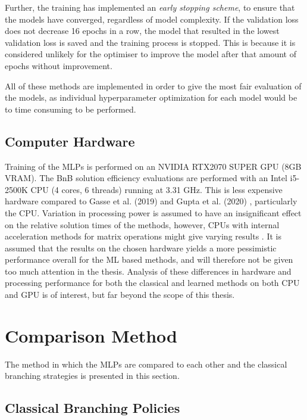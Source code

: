  Further, the training has implemented an \textit{early stopping scheme}, to ensure that the models have converged, regardless of model complexity. If the validation loss does not decrease 16 epochs in a row, the model that resulted in the lowest validation loss is saved and the training process is stopped. This is because it is considered unlikely for the optimiser to improve the model after that amount of epochs without improvement. 
 
 All of these methods are implemented in order to give the most fair evaluation of the models, as individual hyperparameter optimization for each model would be to time consuming to be performed. 


\subsection{Computer Hardware}

Training of the \gls{MLP}s is performed on an NVIDIA RTX2070 SUPER GPU (8GB VRAM). The \gls{BnB} solution efficiency evaluations are performed with an Intel i5-2500K \gls{CPU} (4 cores, 6 threads) running at 3.31 GHz. This is less expensive hardware compared to Gasse et al. (2019) \cite{gasse2019exact} and Gupta et al. (2020) \cite{gupta2020hybrid}, particularly the CPU. Variation in processing power is assumed to have an insignificant effect on the relative solution times of the methods, however, \gls{CPU}s with internal acceleration methods for matrix operations might give varying results \cite{vanhoucke2011improving}. It is assumed that the results on the chosen hardware yields a more pessimistic performance overall for the \gls{ML} based methods, and will therefore not be given too much attention in the thesis. Analysis of these differences in hardware and processing performance for both the classical and learned methods on both \gls{CPU} and \gls{GPU} is of interest, but far beyond the scope of this thesis. 



\section{Comparison Method}

The method in which the \gls{MLP}s are compared to each other and the classical branching strategies is presented in this section.


\subsection{Classical Branching Policies}

